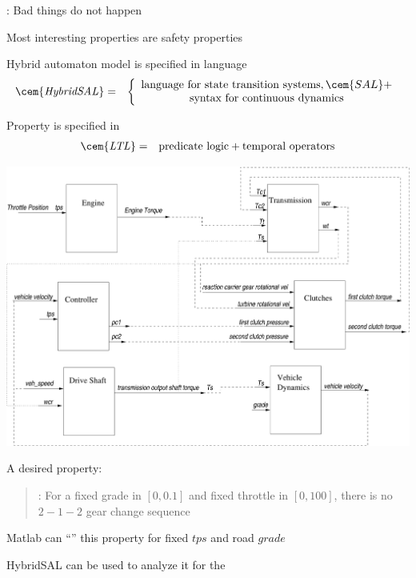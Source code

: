\documentclass{seminar}
\begin{document}
\begin{slide}

{}: Bad things do not happen

{} Most interesting properties are safety properties

\medskip
Hybrid automaton model is specified in {} language
\begin{eqnarray*}
\mathit{{\cem{HybridSAL}}} & = &
 \left\{ \begin{array}{c}
   \mbox{language for state transition systems}, {\cem{SAL}} + 
   \\
   \mbox{syntax for continuous dynamics} \end{array}\right.
\end{eqnarray*}

\medskip
Property is specified in {}
\begin{eqnarray*}
\mathit{{\cem{LTL}}} & = & \mbox{predicate logic} + \mbox{temporal operators}
\end{eqnarray*}

\end{slide}
\begin{slide}

\begin{center}
\includegraphics[angle=0,scale=0.35]{powertrain}
\end{center}

\end{slide}
\begin{slide}

A desired {} property:

\begin{quote}
{}: 
For a fixed grade in $[0,0.1]$ and fixed throttle in $[0,100]$,
there is no $2-1-2$ gear change sequence
\end{quote}

\medskip
Matlab can ``{}'' this property for fixed 
{} $tps$ and road $grade$

\bigskip
HybridSAL can be used to analyze it for the {}

\end{slide}
\end{document}
